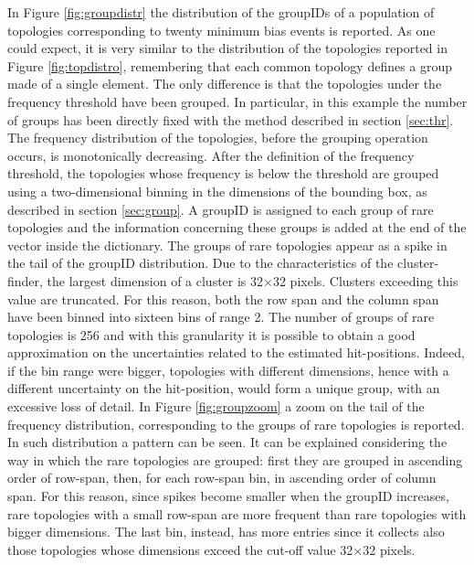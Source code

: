 In Figure \ref{fig:groupdistr} the distribution of the groupIDs of a population of topologies corresponding to twenty minimum bias events is reported. As one could expect, it is very similar to the distribution of the topologies reported in Figure \ref{fig:topdistro}, remembering that each common topology defines a group made of a single element. The only difference is that the topologies under the frequency threshold have been grouped. In particular, in this example the number of groups has been directly fixed with the method described in section \ref{sec:thr}. The frequency distribution of the topologies, before the grouping operation occurs, is monotonically decreasing. After the definition of the frequency threshold, the topologies whose frequency is below the threshold are grouped using a two-dimensional binning in the dimensions of the bounding box, as described in section \ref{sec:group}. A groupID is assigned to each group of rare topologies and the information concerning these groups is added at the end of the vector inside the dictionary. The groups of rare topologies appear as a spike in the tail of the groupID distribution. Due to the characteristics of the cluster-finder, the largest dimension of a cluster is 32$\times$32 pixels. Clusters exceeding this value are truncated. For this reason, both the row span and the column span have been binned into sixteen bins of range 2. The number of groups of rare topologies is 256 and with this granularity it is possible to obtain a good approximation on the uncertainties related to the estimated hit-positions. Indeed, if the bin range were bigger, topologies with different dimensions, hence with a different uncertainty on the hit-position, would form a unique group, with an excessive loss of detail. In Figure \ref{fig:groupzoom} a zoom on the tail of the frequency distribution, corresponding to the groups of rare topologies is reported. In such distribution a pattern can be seen. It can be explained considering the way in which the rare topologies are grouped: first they are grouped in ascending order of row-span, then, for each row-span bin, in ascending order of column span. For this reason, since spikes become smaller when the groupID increases, rare topologies with a small row-span are more frequent than rare topologies with bigger dimensions. The last bin, instead, has more entries since it collects also those topologies whose dimensions exceed the cut-off value 32$\times$32 pixels.
